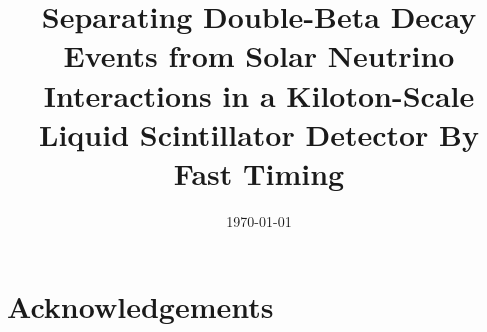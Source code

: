 



\graphicspath{{figs/}}

\linenumbers
{}
%

\large

\title{Separating Double-Beta Decay Events from Solar Neutrino
Interactions in a Kiloton-Scale Liquid Scintillator Detector By Fast Timing}


\begin{abstract}

\end{abstract}

\date{\today}

\maketitle

\clearpage
\tableofcontents

\linenumbers\relax %
\clearpage







\section*{Acknowledgements}



\clearpage



\clearpage



%
%
%
%
%
%
%





%
%


%

